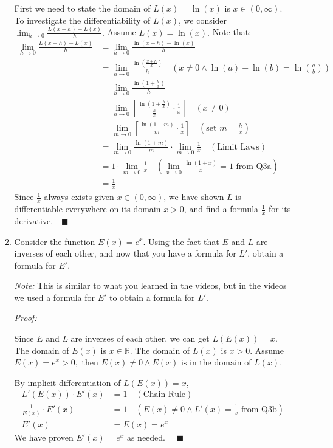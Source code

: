 \documentclass[12pt]{exam}
\newcommand {\DS} [1] {${\displaystyle #1}$}
\newcommand{\vv}{\vspace{.1cm}}
\newcommand{\R}{\mathbb{R}}
\begin{document}
\begin{enumerate}
\begin{enumerate}
		First we need to state the domain of $L(x)=\ln(x)$ is $x\in(0,\infty).$
		To investigate the differentiability of $L(x)$, we consider \DS{\lim_{h \to 0} \frac{L(x+h)-L(x)}{h}.} Assume $L(x)=\ln(x).$ Note that:
		\begin{align*}
		    \lim_{h \to 0} \frac{L(x+h)-L(x)}{h}&=\lim_{h \to 0} \frac{\ln(x+h)-\ln(x)}{h}\\
		    &=\lim_{h \to 0} \frac{\ln(\frac{x+h}{x})}{h}\quad(x\neq0 \land \ln(a)-\ln(b)=\ln(\frac{a}{b}))\\
		    &=\lim_{h \to 0} \frac{\ln(1+\frac{h}{x})}{h}\\
		    &=\lim_{h \to 0}[ \frac{\ln(1+\frac{h}{x})}{\frac{h}{x}}\cdot\frac{1}{x}]\quad(x\neq0)\\
		    &=\lim_{m \to 0}[ \frac{\ln(1+m)}{m}\cdot\frac{1}{x}]\quad(\mbox{set } m=\frac{h}{x})\\
		    &=\lim_{m \to 0} \frac{\ln(1+m)}{m}\cdot\lim_{m \to 0}\frac{1}{x}\quad(\mbox{Limit Laws})\\
		    &=1\cdot\lim_{m \to 0}\frac{1}{x}\quad(\lim_{x \to 0} \frac{\ln (1+x)}{x} = 1 \mbox{ from Q3a})\\
		    &=\frac{1}{x}
		\end{align*}
		Since $\frac{1}{x}$ always exists given $x\in(0,\infty)$, we have shown $L$ is differentiable everywhere on its domain $x>0$, and find a formula $\frac{1}{x}$ for its derivative.$\quad\blacksquare$
		
\newpage

		\item  Consider the function \DS{E(x) = e^x}.  Using the fact that $E$ and $L$ are inverses of each other, and now that you have a formula for $L'$, obtain a formula for $E'$.
		
			\emph{Note:}  This is similar to what you learned in the videos, but in the videos we used a formula for $E'$ to obtain a formula for $L'$.
	    \vv
	    
	    \emph{Proof:}
	    
	    \vv
	    
	    Since $E$ and $L$ are inverses of each other, we can get $L(E(x))=x.$ The domain of $E(x)$ is $x\in\R.$ The domain of $L(x)$ is $x > 0.$ Assume $E(x)=e^x>0,\mbox{ then } E(x)\neq0 \land E(x)\mbox{ is in the domain of } L(x).$
	    
	    By implicit differentiation of $L(E(x))=x$, 
	    \begin{align*}
	        L'(E(x))\cdot E'(x)&=1\quad(\mbox{Chain Rule})\\
	        \frac{1}{E(x)}\cdot E'(x)&=1\quad(E(x)\neq0 \land L'(x)=\frac{1}{x}\mbox{ from Q3b})\\
	        E'(x)&=E(x)=e^x
	    \end{align*}
	    We have proven $E'(x)=e^x$ as needed. $\quad\blacksquare$
	\end{enumerate}


\end{enumerate}
\end{document}
